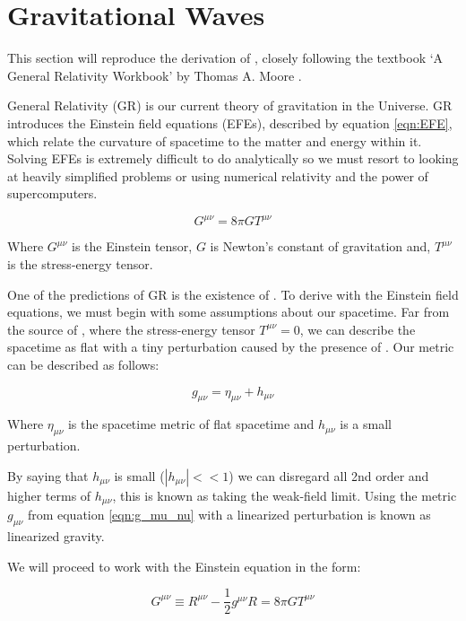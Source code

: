\section{\label{sec:GWs}Gravitational Waves}

This section will reproduce the derivation of \gws, closely following the textbook `A General Relativity Workbook' by Thomas A. Moore \cite{moore_2013}.

General Relativity (GR) is our current theory of gravitation in the Universe. GR introduces the Einstein field equations (EFEs), described by equation \ref{eqn:EFE}, which relate the curvature of spacetime to the matter and energy
within it. Solving EFEs is extremely difficult to do analytically so we must resort to looking at heavily simplified problems or using numerical relativity and the power of supercomputers.

\begin{equation}
   G^{\mu \nu} = 8 \pi G T^{\mu \nu}
   \label{eqn:EFE}
\end{equation}

Where $G^{\mu \nu}$ is the Einstein tensor, $G$ is Newton's constant of gravitation and, $T^{\mu \nu}$ is the stress-energy tensor.

One of the predictions of GR is the existence of \gws. To derive \gws with the Einstein field equations, we must begin with some assumptions about our spacetime. Far from the source of \gws, where the stress-energy tensor
$T^{\mu \nu} = 0$, we can describe the spacetime as flat with a tiny perturbation caused by the presence of \gws. Our metric can be described as follows:

\begin{equation}
   g_{\mu \nu} = \eta_{\mu \nu} + h_{\mu \nu}
   \label{eqn:g_mu_nu}
\end{equation}

Where $\eta_{\mu \nu}$ is the spacetime metric of flat spacetime and $h_{\mu \nu}$ is a small perturbation.

By saying that $h_{\mu \nu}$ is small ($|h_{\mu \nu}| << 1$) we can disregard all 2nd order and higher terms of $h_{\mu \nu}$, this is known as taking the weak-field limit. Using the metric $g_{\mu \nu}$ from equation \ref{eqn:g_mu_nu} with a linearized perturbation is known as linearized gravity.

We will proceed to work with the Einstein equation in the form:

\begin{equation}
   G^{\mu \nu} \equiv R^{\mu \nu} - \frac{1}{2} g^{\mu \nu} R = 8 \pi G T^{\mu \nu}
   \label{eqn:EFE2}
\end{equation}

